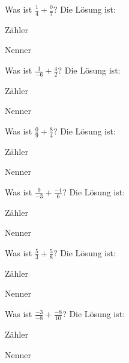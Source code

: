\documentclass{ximera}
\begin{document}
\begin{shuffle}
\begin{question}
Was ist $\frac{1}{4} + \frac{0}{7}$?
Die Lösung ist:
\begin{solution}
Zähler 
\end{solution}
\begin{solution}
Nenner 
\end{solution}
\end{question}


\begin{question}
Was ist $\frac{1}{-6} + \frac{4}{2}$?
Die Lösung ist:
\begin{solution}
Zähler 
\end{solution}
\begin{solution}
Nenner 
\end{solution}
\end{question}


\begin{question}
Was ist $\frac{0}{9} + \frac{8}{4}$?
Die Lösung ist:
\begin{solution}
Zähler 
\end{solution}
\begin{solution}
Nenner 
\end{solution}
\end{question}


\begin{question}
Was ist $\frac{9}{-3} + \frac{-1}{6}$?
Die Lösung ist:
\begin{solution}
Zähler 
\end{solution}
\begin{solution}
Nenner 
\end{solution}
\end{question}


\begin{question}
Was ist $\frac{5}{3} + \frac{5}{8}$?
Die Lösung ist:
\begin{solution}
Zähler 
\end{solution}
\begin{solution}
Nenner 
\end{solution}
\end{question}


\begin{question}
Was ist $\frac{-3}{-8} + \frac{-8}{10}$?
Die Lösung ist:
\begin{solution}
Zähler 
\end{solution}
\begin{solution}
Nenner 
\end{solution}
\end{question}



\end{shuffle}
\end{document}
